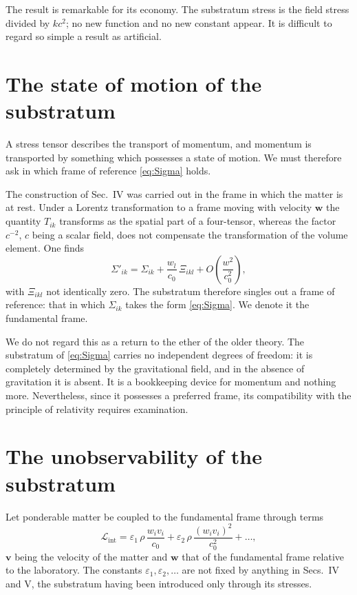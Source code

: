 \documentclass[aps,prd,reprint,amsmath,amssymb,nofootinbib,longbibliography]{revtex4-2}
\begin{document}
The result is remarkable for its economy. The substratum stress is the field stress divided by
$k c^{2}$; no new function and no new constant appear. It is difficult to regard so simple a
result as artificial.

\section{The state of motion of the substratum}

A stress tensor describes the transport of momentum, and momentum is transported by something which
possesses a state of motion. We must therefore ask in which frame of reference \eqref{eq:Sigma}
holds.

The construction of Sec.~IV was carried out in the frame in which the matter is at rest. Under a
Lorentz transformation to a frame moving with velocity $\bm w$ the quantity $T_{ik}$ transforms as
the spatial part of a four-tensor, whereas the factor $c^{-2}$, $c$ being a scalar field, does not
compensate the transformation of the volume element. One finds
\begin{equation}
\Sigma'_{ik} = \Sigma_{ik} + \frac{w_l}{c_0}\, \Xi_{ikl} + O\!\left(\frac{w^{2}}{c_0^{2}}\right) ,
\label{eq:transf}
\end{equation}
with $\Xi_{ikl}$ not identically zero. The substratum therefore singles out a frame of reference:
that in which $\Sigma_{ik}$ takes the form \eqref{eq:Sigma}. We denote it the fundamental frame.

We do not regard this as a return to the ether of the older theory. The substratum of
\eqref{eq:Sigma} carries no independent degrees of freedom: it is completely determined by the
gravitational field, and in the absence of gravitation it is absent. It is a bookkeeping device for
momentum and nothing more. Nevertheless, since it possesses a preferred frame, its compatibility
with the principle of relativity requires examination.

\section{The unobservability of the substratum}

Let ponderable matter be coupled to the fundamental frame through terms
\begin{equation}
\mathcal{L}_{\text{int}} = \varepsilon_1\, \rho\, \frac{w_i v_i}{c_0}
   + \varepsilon_2\, \rho\, \frac{(w_i v_i)^{2}}{c_0^{2}} + \dots ,
\label{eq:int}
\end{equation}
$\bm v$ being the velocity of the matter and $\bm w$ that of the fundamental frame relative to the
laboratory. The constants $\varepsilon_1, \varepsilon_2, \dots$ are not fixed by anything in
Secs.~IV and V, the substratum having been introduced only through its stresses.
\end{document}
